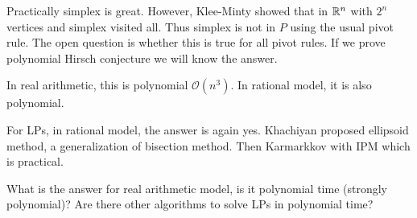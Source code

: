 \documentclass[class=article,crop=false]{standalone}
\begin{document}
Practically simplex is great. However, Klee-Minty showed that in $ \mathbb{R}^{n}$ with $ 2^{n}$ vertices and simplex visited all. Thus simplex is not in $ P$ using the usual pivot rule. The open question is whether this is true for all pivot rules. If we prove polynomial Hirsch conjecture we will know the answer.

\begin{eg}
	In real arithmetic, this is polynomial $ \mathcal{ O}(n^3)$. In rational model, it is also polynomial.

	For LPs, in rational model, the answer is again yes. Khachiyan proposed ellipsoid method, a generalization of bisection method. Then Karmarkkov with IPM which is practical.
\end{eg}
What is the answer for real arithmetic model, is it polynomial time (strongly polynomial)?
Are there other algorithms to solve LPs in polynomial time?
\end{document}
